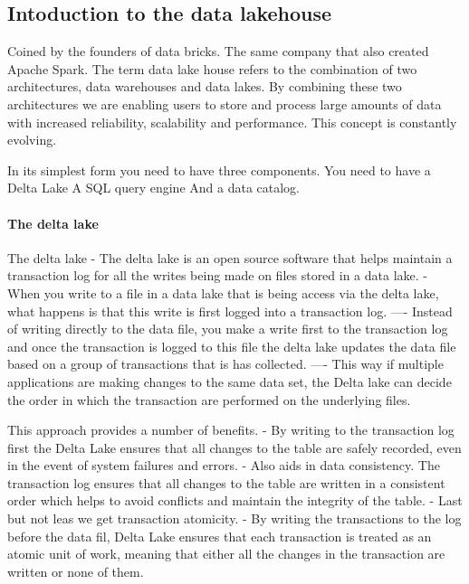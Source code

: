\documentclass[a4paper, 11pt]{article}
\begin{document}
    \subsection{Intoduction to the data lakehouse}

    Coined by the founders of data bricks. The same company that also created Apache Spark.
    The term data lake house refers to the combination of two architectures, data warehouses and data lakes.
    By combining these two architectures we are enabling users to store and process large amounts of data with increased reliability, scalability and performance.
    This concept is constantly evolving.

    In its simplest form you need to have three components.
    You need to have a Delta Lake
    A SQL query engine
    And a data catalog.

    \paragraph{The delta lake}
    The delta lake
    - The delta lake is an open source software that helps maintain a transaction log for all the writes being made on files stored in a data lake.
    - When you write to a file in a data lake that is being access via the delta lake, what happens is that this write is first logged into a transaction log.
    ---- Instead of writing directly to the data file, you make a write first to the transaction log and once the transaction is logged to this file the delta lake updates the data file based on a group of transactions that is has collected.
    ---- This way if multiple applications are making changes to the same data set, the Delta lake can decide the order in which the transaction are performed on the underlying files.

    This approach provides a number of benefits.
    - By writing to the transaction log first the Delta Lake ensures that all changes to the table are safely recorded, even in the event of system failures and errors.
    - Also aids in data consistency.
    The transaction log ensures that all changes to the table are written in a consistent order which helps to avoid conflicts and maintain the integrity of the table.
    - Last but not leas we get transaction atomicity.
    - By writing the transactions to the log before the data fil, Delta Lake ensures that each transaction is treated as an atomic unit of work, meaning that either all the changes in the transaction are written or none of them.
\end{document}
